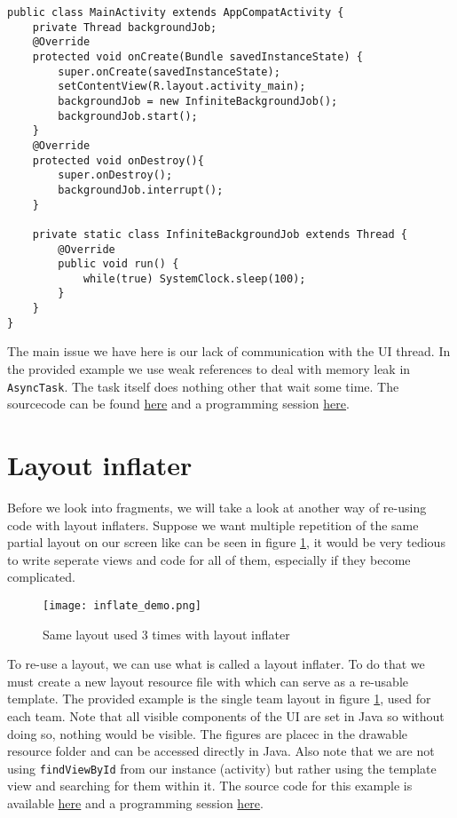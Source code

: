 \begin{lstlisting}[style=A_Java]
public class MainActivity extends AppCompatActivity {
    private Thread backgroundJob;
    @Override
    protected void onCreate(Bundle savedInstanceState) {
        super.onCreate(savedInstanceState);
        setContentView(R.layout.activity_main);
        backgroundJob = new InfiniteBackgroundJob();
        backgroundJob.start();
    }
    @Override
    protected void onDestroy(){
        super.onDestroy();
        backgroundJob.interrupt();
    }

    private static class InfiniteBackgroundJob extends Thread {
        @Override
        public void run() {
            while(true) SystemClock.sleep(100);
        }
    }
}
\end{lstlisting}
The main issue we have here is our lack of communication with the UI thread. In the provided example we use weak references to deal with memory leak in \texttt{AsyncTask}. The task itself does nothing other that wait some time. The sourcecode can be found \href{https://github.com/JonSteinn/AndroidDevelopment/tree/master/examples/lab3/weakreference}{here} and a programming session \href{https://youtu.be/Ifm1mICWvH4}{here}.

\section{Layout inflater}
Before we look into fragments, we will take a look at another way of re-using code with layout inflaters. Suppose we want multiple repetition of the same partial layout on our screen like can be seen in figure \ref{fig:infldem}, it would be very tedious to write seperate views and code for all of them, especially if they become complicated.

\begin{figure}[H]
\centering
\texttt{[image: inflate\_demo.png]}
\caption{Same layout used 3 times with layout inflater}
\label{fig:infldem}
\end{figure}

To re-use a layout, we can use what is called a layout inflater. To do that we must create a new layout resource file with  which can serve as a re-usable template. The provided example is the single team layout in figure \ref{fig:infldem}, used for each team. Note that all visible components of the UI are set in Java so without doing so, nothing would be visible. The figures are placec in the drawable resource folder and can be accessed directly in Java. Also note that we are not using \texttt{findViewById} from our instance (activity) but rather using the template view and searching for them within it. The source code for this example is available \href{https://github.com/JonSteinn/AndroidDevelopment/tree/master/examples/lab3/inflator}{here} and a programming session \href{https://youtu.be/GZjS8k0Ucxw}{here}.

